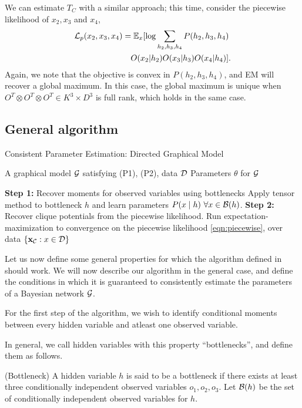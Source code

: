 We can estimate $T_C$ with a similar approach; this time, consider the
  piecewise likelihood of $x_2, x_3$ and $x_4$, 
\begin{align}
  \mathcal{L}_p(x_2, x_3, x_4) &= \mathbb{E}_{x}[\log \sum_{h_2,h_3,h_4} P(h_2,h_3,h_4)  \\
   &\quad   O(x_2|h_2) O(x_3|h_3) O(x_4|h_4)].
\end{align}
Again, we note that the objective is convex in $P(h_2, h_3, h_4)$, and
  EM will recover a global maximum. 
In this case, the global maximum is unique when $O^T \otimes O^T \otimes
  O^T \in K^3 \times D^3$ is full rank, which holds in the same case.

\subsection{General algorithm}

\renewcommand{\algorithmicrequire}{\textbf{Input:}}
\renewcommand{\algorithmicensure}{\textbf{Output:}}
\begin{algorithm}
  \caption{Consistent Parameter Estimation: Directed Graphical Model}
  \label{algo:directed}
  \begin{algorithmic}
    \REQUIRE A graphical model $\mathcal{G}$ satisfying (P1), (P2), data $\mathcal{D}$
    \ENSURE Parameters $\theta$ for $\mathcal{G}$

    \STATE \textbf{Step 1:} Recover moments for observed variables using
    bottlenecks
        \STATE Apply tensor method to bottleneck $h$ and learn parameters $P(x \mid h) ~ \forall x \in \mathcal{B}(h)$.
      \ENDFOR
    \STATE \textbf{Step 2:} Recover clique potentials from the piecewise likelihood.
      \STATE Run expectation-maximization to convergence on the piecewise likelihood \eqref{eqn:piecewise},
        over data $\{\mathbf{x}_{\mathcal{C}} : x \in \mathcal{D}\}$
      \ENDFOR
  \end{algorithmic}
\end{algorithm}

Let us now define some general properties for which the algorithm
defined in  should work.
We will now describe our algorithm in the general case, and define the
conditions in which it is guaranteed to consistently estimate the
parameters of a Bayesian network $\mathcal{G}$.

For the first step of the algorithm, we wish to identify conditional
moments between every hidden variable and atleast one observed variable.
  
In general, we call hidden variables with this property ``bottlenecks'',
  and define them as follows.
\begin{definition}(Bottleneck)
  A hidden variable $h$ is said to be a bottleneck if there exists at
  least three conditionally independent observed variables $o_1, o_2,
  o_3$. Let $\mathcal{B}(h)$ be the set of conditionally independent observed
  variables for $h$.
\end{definition}

